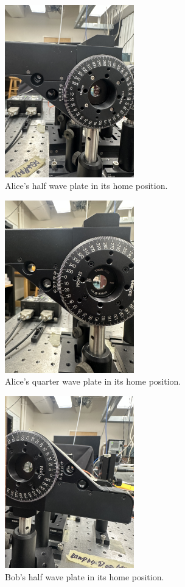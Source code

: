 \documentclass{paper}[11pt]
\begin{document}
	\begin{figure}[hp]
		\centering
		\includegraphics[angle=-90, origin=c, width=0.5\textwidth]{figures/AHWP_HOME.JPG}
		\caption{Alice's half wave plate in its home position.}
		\label{fig:AHWP home}
	\end{figure}
	\begin{figure}[hp]
		\centering
		\includegraphics[angle=-90, origin=c, width=0.5\textwidth]{figures/AQWP_HOME.JPG}
		\caption{Alice's quarter wave plate in its home position.}
		\label{fig:AQWP home}
	\end{figure}
	\begin{figure}[hp]
		\centering
		\includegraphics[angle=-90, origin=c, width=0.5\textwidth]{figures/BHWP_HOME.JPG}
		\caption{Bob's half wave plate in its home position.}
		\label{fig:BHWP home}
	\end{figure}
\end{document}

